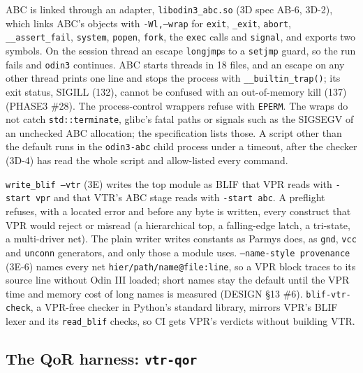 \documentclass[conference]{IEEEtran}
\newcommand{\code}[1]{\texttt{#1}}
\begin{document}
ABC is linked through an adapter, \code{libodin3\_abc.so} (3D spec AB-6, 3D-2), which links
ABC's objects with \code{-Wl,--wrap} for \code{exit}, \code{\_exit}, \code{abort},
\code{\_\_assert\_fail}, \code{system}, \code{popen}, \code{fork}, the \code{exec} calls and
\code{signal}, and exports two symbols. On the session thread an escape \code{longjmp}s to a
\code{setjmp} guard, so the run fails and \code{odin3} continues. ABC starts threads in 18
files, and an escape on any other thread prints one line and stops the process with
\code{\_\_builtin\_trap()}; its exit status, SIGILL (132), cannot be confused with an
out-of-memory kill (137) (PHASE3 \#28). The process-control wrappers refuse with
\code{EPERM}. The wraps do not catch \code{std::terminate}, glibc's fatal paths or signals such
as the SIGSEGV of an unchecked ABC allocation; the specification lists those. A script other
than the default runs in the \code{odin3-abc} child process under a timeout, after the checker
(3D-4) has read the whole script and allow-listed every command.

\code{write\_blif --vtr} (3E) writes the top module as BLIF that VPR reads with
\code{-start vpr} and that VTR's ABC stage reads with \code{-start abc}. A preflight refuses,
with a located error and before any byte is written, every construct that VPR would reject or
misread (a hierarchical top, a falling-edge latch, a tri-state, a multi-driver net). The plain
writer writes constants as Parmys does, as \code{gnd}, \code{vcc} and \code{unconn}
generators, and only those a module uses. \code{--name-style provenance} (3E-6) names every net
\code{hier/path/name@file:line}, so a VPR block traces to its source line without Odin III
loaded; short names stay the default until the VPR time and memory cost of long names is
measured (DESIGN \S13 \#6). \code{blif-vtr-check}, a VPR-free checker in Python's standard
library, mirrors VPR's BLIF lexer and its \code{read\_blif} checks, so CI gets VPR's verdicts
without building VTR.

\subsection{The QoR harness: \code{vtr-qor}}
\label{sec:harness}
\end{document}
